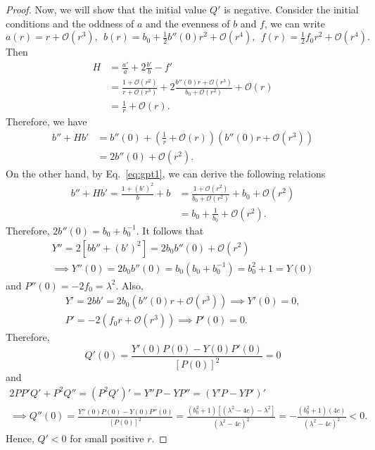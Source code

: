 \documentclass[11pt,letterpaper]{article}
\begin{document}
\begin{proof}
    \newpar

    Now, we will show that the initial value $Q'$ is negative. Consider the initial conditions and the oddness of $a$ and the evenness of $b$ and $f$, we can write
    \[
        a(r) = r + \mathcal O(r^3),\ \ b(r) = b_0 + \tfrac12 b''(0) r^2 + \mathcal O(r^4),\ \ f(r) = \tfrac12 f_0 r^2 + \mathcal O(r^4).
    \]
    Then
    \begin{align}
        H &= \frac{a'}{a} + 2\frac{b'}{b} - f' \\
        &= \frac{1 + \mathcal O(r^2)}{r + \mathcal O(r^3)} + 2 \frac{b''(0)r + \mathcal O(r^3)}{b_0 + \mathcal O(r^2)} + \mathcal O(r) \\
        &= \frac1r + \mathcal O(r).
    \end{align}
    Therefore, we have
    \begin{align}
        b'' + Hb' &= b''(0) + \left( \frac1r + \mathcal O(r) \right) (b''(0) r + \mathcal O(r^3)) \\
        &= 2b''(0) + \mathcal O(r^2). \label{eq:bbyahu1}
    \end{align}
    On the other hand, by Eq.~\eqref{eq:gpt1}, we can derive the following relations
    \begin{align}
        b'' + Hb' = \frac{1 + (b')^2}{b} + b &= \frac{1 + \mathcal O(r^2)}{b_0 + \mathcal O(r^2)} + b_0 + \mathcal O(r^2) \\
        &= b_0 + \frac1{b_0} + \mathcal O(r^2). \label{eq:bbyahu2}
    \end{align}
    Therefore, $2b''(0) = b_0 + b_0^{-1}$. It follows that
    \begin{gather*}
        Y'' = 2[bb'' + (b')^2] = 2b_0 b''(0) + \mathcal O(r^2) \\
        \implies Y''(0) = 2b_0 b''(0) = b_0 (b_0 + b_0^{-1}) = b_0^2 + 1 = Y(0)
    \end{gather*}
    and $P''(0) = -2f_0 = \lambda^2$. Also,
    \begin{gather*}
        Y' = 2bb' = 2b_0(b''(0)r + \mathcal O(r^3)) \implies Y'(0) = 0, \\
        P' = -2(f_0 r + \mathcal O(r^3)) \implies P'(0) = 0.
    \end{gather*}
    Therefore,
    \begin{equation}
        Q'(0) = \frac{Y'(0) P(0) - Y(0) P'(0)}{[P(0)]^2} = 0
    \end{equation}
    and
    \begin{gather}
        2PP'Q' + P^2 Q'' = (P^2 Q')' = Y''P - YP'' = (Y'P - YP')' \\
        \implies Q''(0) = \frac{Y''(0) P(0) - Y(0) P''(0)}{[P(0)]^2} = \frac{(b_0^2 + 1)[(\lambda^2 - 4c) - \lambda^2]}{(\lambda^2 - 4c)^2} = -\frac{(b_0^2 + 1)(4c)}{(\lambda^2 - 4c)^2} < 0.
    \end{gather}
    Hence, $Q' < 0$ for small positive $r$.
\end{proof}
\end{document}
